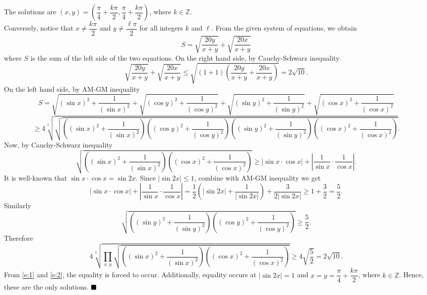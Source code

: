 \documentclass[11pt]{article}
\newenvironment{solution}[1][Solution]{%
  \proof[\normalfont \faPenNib \hspace{0.2cm} \ttfamily \scshape \large #1]%
}{\(\hfill \blacksquare\){\parfillskip0pt\par}}
\theoremstyle{definition}
\begin{document}
        \begin{solution}
            The solutions are \((x,y) = \left(\dfrac{\pi}{4} + \dfrac{k\pi}{2}, \dfrac{\pi}{4} + \dfrac{k\pi}{2}\right)\), where \(k \in \mathbb{Z}\).\\
            Conversely, notice that \(x \neq \dfrac{k\pi}{2}\) and \(y \neq \dfrac{\ell\pi}{2}\) for all integers \(k\) and \(\ell\). From the given system of equations, we obtain
            \[S = \sqrt{\frac{20y}{x + y}} + \sqrt{\frac{20x}{x + y}}\]
            where \(S\) is the sum of the left side of the two equations. On the right hand side, by Cauchy-Schwarz inequality
            \begin{equation}
                \sqrt{\frac{20y}{x + y}} + \sqrt{\frac{20x}{x + y}} \leq \sqrt{(1 + 1)\left(\frac{20y}{x + y} + \frac{20x}{x + y}\right)} = 2\sqrt{10}.
                \label{e:1}
            \end{equation}
            On the left hand side, by AM-GM inequality
            \[S = \sqrt{\left(\sin x\right)^2 + \frac{1}{\left(\sin x\right)^2}} + \sqrt{\left(\cos y\right)^2 + \frac{1}{\left(\cos y\right)^2}} + \sqrt{\left(\sin y\right)^2 + \frac{1}{\left(\sin y\right)^2}} + \sqrt{\left(\cos x\right)^2 + \frac{1}{\left(\cos x\right)^2}}\]
            \[\geq 4\sqrt[4]{\sqrt{\left(\left(\sin x\right)^2 + \frac{1}{\left(\sin x\right)^2}\right)\left(\left(\cos y\right)^2 + \frac{1}{\left(\cos y\right)^2}\right)\left(\left(\sin y\right)^2 + \frac{1}{\left(\sin y\right)^2}\right)\left(\left(\cos x\right)^2 + \frac{1}{\left(\cos x\right)^2}\right)}}.\]
            Now, by Cauchy-Schwarz inequality
            \[\sqrt{\left(\left(\sin x\right)^2 + \frac{1}{\left(\sin x\right)^2}\right)\left(\left(\cos x\right)^2 + \frac{1}{\left(\cos x\right)^2}\right)} \geq \left| \sin x \cdot \cos x \right| + \left| \frac{1}{\sin x} \cdot \frac{1}{\cos x} \right|.\]
            It is well-known that \(\sin x \cdot \cos x = \sin 2x\). Since \(\left|\sin 2x\right| \leq 1\), combine with AM-GM inequality we get
            \[\left| \sin x \cdot \cos x \right| + \left| \frac{1}{\sin x} \cdot \frac{1}{\cos x} \right| = \frac{1}{2} \left( \left| \sin 2x \right| + \frac{1}{\left| \sin 2x \right|} \right) + \frac{3}{2\left|\sin 2x\right|} \geq 1 + \frac{3}{2} = \frac{5}{2}.\]
            Similarly
            \[\sqrt{\left(\left(\sin y\right)^2 + \frac{1}{\left(\sin y\right)^2}\right)\left(\left(\cos y\right)^2 + \frac{1}{\left(\cos y\right)^2}\right)} \geq \frac{5}{2}.\]
            Therefore
            \begin{equation}
                4\sqrt[4]{\prod_{x,y}\sqrt{\left(\left(\sin x\right)^2 + \frac{1}{\left(\sin x\right)^2}\right)\left(\left(\cos x\right)^2 + \frac{1}{\left(\cos x\right)^2}\right)}} 
                \geq 4 \sqrt{\dfrac{5}{2}} = 2\sqrt{10}.
                \label{e:2}
            \end{equation}
            From \eqref{e:1} and \eqref{e:2}, the equality is forced to occur. Additionally, equality occurs at \(\left| \sin 2x \right| = 1\) and \(x = y = \dfrac{\pi}{4} + \dfrac{k\pi}{2}\), where \(k \in \mathbb{Z}\). Hence, these are the only solutions.
        \end{solution}
\end{document}
